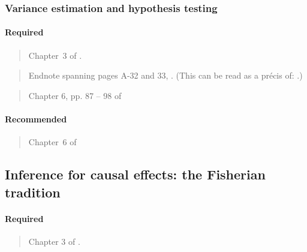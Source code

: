 \documentclass[12pt]{article}
\begin{document}
\subsubsection{Variance estimation and hypothesis testing}

\paragraph*{Required}

\begin{verse}
  Chapter~3 of .
\end{verse}

\begin{verse} Endnote spanning pages A-32 and 33,
  .  (This can be read as a pr{\'e}cis
  of: .)
\end{verse}

\begin{verse} Chapter 6, pp. 87 -- 98 of  \end{verse}

\paragraph*{Recommended}

\begin{verse} Chapter~6 of  \end{verse}

\begin{verse}  \end{verse}

\begin{verse}  \end{verse}

\begin{verse}  \end{verse}

\subsection{Inference for causal effects: the Fisherian tradition}

\paragraph*{Required}

\begin{verse}
  Chapter 3 of .
\end{verse}
\end{document}
